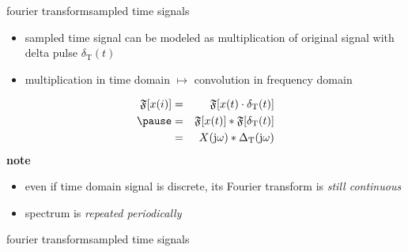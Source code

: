         \begin{frame}{fourier transform}{sampled time signals}
            \begin{itemize}
                \item   sampled time signal can be modeled as multiplication of original signal with delta pulse $\delta_\mathrm{T}(t)$
                \item   multiplication in time domain $\mapsto$ convolution in frequency domain
            \end{itemize}
            \begin{eqnarray*}\label{eq:ft_sampled}
                \mathfrak{F}[x(i)] 	&=& \mathfrak{F}[x(t)\cdot \delta_\mathrm{T}(t)]\nonumber\\
                \pause
                                    &=& \mathfrak{F}[x(t)]\ast \mathfrak{F}[\delta_\mathrm{T}(t)]\nonumber\\
                                    &=& X(\jom)\ast \Delta_\mathrm{T}(\jom) 
            \end{eqnarray*}
            \pause
            \textbf{note}
            \begin{itemize}
                \item   even if time domain signal is discrete, its Fourier transform is \textit{still continuous}
                \item   spectrum is \textit{repeated periodically}
            \end{itemize}
            
        \end{frame}	

        \begin{frame}{fourier transform}{sampled time signals}
        \end{frame}	

